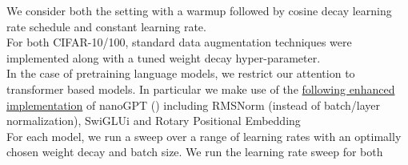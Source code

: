 \documentclass[12pt]{book}
\begin{document}
We consider both the setting with a warmup followed by cosine decay learning rate schedule and constant learning rate. 
\\
For both CIFAR-10/100, standard data augmentation techniques were implemented along with a tuned weight decay hyper-parameter. 
\\
In the case of pretraining language models, we restrict our attention to transformer based models. In particular we make use of the \href{https://github.com/Niccolo-Ajroldi/plainLM/tree/main}{following enhanced implementation} of nanoGPT (\cite{Karpathy2022}) including RMSNorm (instead of batch/layer normalization), SwiGLUi\cite{swiGLU} and Rotary Positional Embedding
\\
For each model, we run a sweep over a range of learning rates with an optimally chosen weight decay and batch size. We run the learning rate sweep for both 
\\
\end{document}
